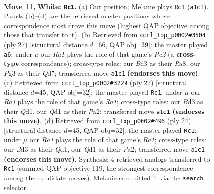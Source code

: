 \documentclass[11pt]{article}
\begin{document}
\clearpage

\begin{figure}[p]\centering
\begin{subfigure}{0.46\textwidth}\centering
\resizebox{\linewidth}{!}{%
\newchessgame
\chessboard[
  setfen={rnbq1rk1/1p3pp1/4pn2/p2p3p/3P4/2NB1NP1/PPP2PP1/R2Q1RK1 w - - 0 11},
  showmover=false,
  pgfstyle=straightmove, color=movearrow, markmove={a1-c1}
]}
\caption{}
\end{subfigure}\hfill
\begin{subfigure}{0.46\textwidth}\centering
\resizebox{\linewidth}{!}{%
\newchessgame
\chessboard[
  setfen={r4rk1/pppq1ppp/2nb1n2/4p3/P3P3/2NP1N2/1PP1Q1PP/R1B2RK1 b - - 0 14},
  showmover=false,
  pgfstyle=straightmove, color=movearrow, markmove={a7-a6}
]}
\caption{}
\end{subfigure}
\\[4pt]
\begin{subfigure}{0.46\textwidth}\centering
\resizebox{\linewidth}{!}{%
\newchessgame
\chessboard[
  setfen={rn3rk1/pbp1qppp/1p3n2/3p4/3P4/2NBPN2/PP3PPP/R2Q1RK1 w - - 4 12},
  showmover=false,
  pgfstyle=straightmove, color=movearrow, markmove={a1-c1}
]}
\caption{}
\end{subfigure}\hfill
\begin{subfigure}{0.46\textwidth}\centering
\resizebox{\linewidth}{!}{%
\newchessgame
\chessboard[
  setfen={rn3rk1/pbp1qppp/1p3n2/3p4/3P4/2NBPN2/PP3PPP/R2Q1RK1 w - - 0 13},
  showmover=false,
  pgfstyle=straightmove, color=movearrow, markmove={a1-c1}
]}
\caption{}
\end{subfigure}
\caption{\textbf{Move 11, White: \texttt{Rc1}.} (a) Our position; Melanie plays \texttt{Rc1} (\texttt{a1c1}). Panels (b)--(d) are the retrieved master positions whose correspondence most drove this move (highest QAP objective among those that transfer to it). (b) Retrieved from \texttt{ccrl\_top\_p0002\#3604} (ply 27) [structural distance $d$=66, QAP obj=39]: the master played \texttt{a6}; under $\mu$ our \emph{Ra1} plays the role of that game's \emph{Pa2} (a \textbf{cross-type} correspondence); cross-type roles: our \emph{B}d3 as their \emph{R}a8, our \emph{P}g3 as their \emph{Q}d7; transferred move \texttt{a1c1} \textbf{(endorses this move)}. (c) Retrieved from \texttt{ccrl\_top\_p0002\#3229} (ply 22) [structural distance $d$=45, QAP obj=32]: the master played \texttt{Rc1}; under $\mu$ our \emph{Ra1} plays the role of that game's \emph{Ra1}; cross-type roles: our \emph{B}d3 as their \emph{Q}d1, our \emph{Q}d1 as their \emph{P}a2; transferred move \texttt{a1c1} \textbf{(endorses this move)}. (d) Retrieved from \texttt{ccrl\_top\_p0002\#496} (ply 24) [structural distance $d$=45, QAP obj=32]: the master played \texttt{Rc1}; under $\mu$ our \emph{Ra1} plays the role of that game's \emph{Ra1}; cross-type roles: our \emph{B}d3 as their \emph{Q}d1, our \emph{Q}d1 as their \emph{P}a2; transferred move \texttt{a1c1} \textbf{(endorses this move)}. Synthesis: 4 retrieved analogs transferred to \texttt{Rc1} (summed QAP objective 119, the strongest correspondence among the candidate moves); Melanie committed it via the \texttt{search} selector.}
\label{fig:thought-m20}
\end{figure}
\end{document}

